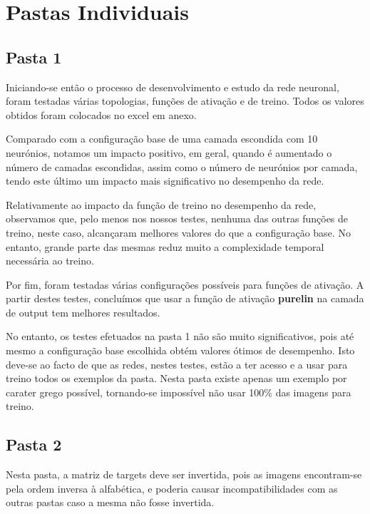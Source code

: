 \documentclass[11pt]{article}
\begin{document}
	\pagebreak
	
	\large
	\section{Pastas Individuais}
	\subsection{Pasta 1}
	\normalsize
	
	Iniciando-se então o processo de desenvolvimento e estudo da rede neuronal, foram testadas várias topologias, funções de ativação e de treino. Todos os valores obtidos foram colocados no excel em anexo.
	
	Comparado com a configuração base de uma camada escondida com 10 neurónios, notamos um impacto positivo, em geral, quando é aumentado o número de camadas escondidas, assim como o número de neurónios por camada, tendo este último um impacto mais significativo no desempenho da rede.
	
	Relativamente ao impacto da função de treino no desempenho da rede, observamos que, pelo menos nos nossos testes, nenhuma das outras funções de treino, neste caso, alcançaram melhores valores do que a configuração base. No entanto, grande parte das mesmas reduz muito a complexidade temporal necessária ao treino.
	
	Por fim, foram testadas várias configurações possíveis para funções de ativação. A partir destes testes, concluímos que usar a função de ativação \textbf{purelin} na camada de output tem melhores resultados.
	
	No entanto, os testes efetuados na pasta 1 não são muito significativos, pois até mesmo a configuração base escolhida obtém valores ótimos de desempenho. Isto deve-se ao facto de que as redes, nestes testes, estão a ter acesso e a usar para treino todos os exemplos da pasta. Nesta pasta existe apenas um exemplo por carater grego possível, tornando-se impossível não usar 100\% das imagens para treino.
	
	\pagebreak
	
	
	\large
	\subsection{Pasta 2}
	\normalsize
	
	Nesta pasta, a matriz de targets deve ser invertida, pois as imagens encontram-se pela ordem inversa à alfabética, e poderia causar incompatibilidades com as outras pastas caso a mesma não fosse invertida.
	
\end{document}
